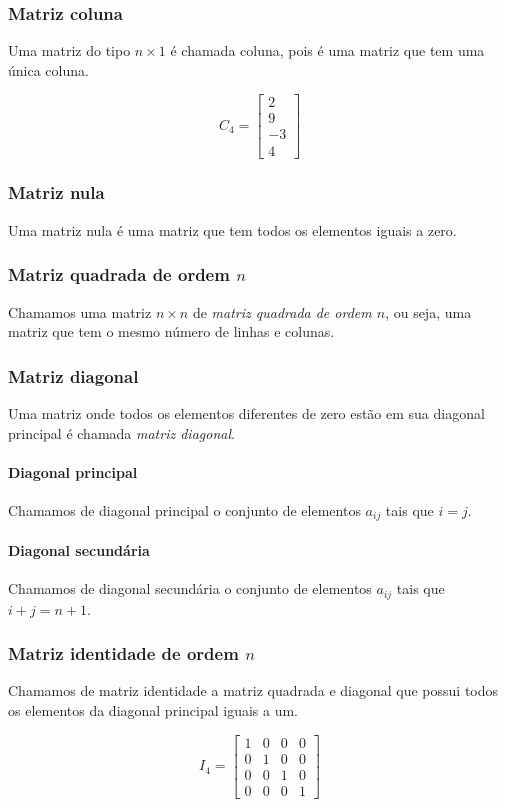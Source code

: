 \subsubsection*{Matriz coluna} Uma matriz do tipo $n \times 1$ é chamada coluna, pois é uma matriz que tem uma única coluna.
\begin{exemplo}
\[C_4=\begin{bmatrix} 
2 \\
9 \\
-3 \\
4 
\end{bmatrix}\]
\end{exemplo}

\subsubsection*{Matriz nula} Uma matriz nula é uma matriz que tem todos os elementos iguais a zero.
\subsubsection*{Matriz quadrada de ordem $n$} Chamamos uma matriz $n \times n$ de \emph{matriz quadrada de ordem $n$}, ou seja, uma matriz que tem o mesmo número de linhas e colunas.
\subsubsection*{Matriz diagonal}
Uma matriz onde todos os elementos diferentes de zero estão em sua diagonal principal é chamada \emph{matriz diagonal}.
\paragraph{Diagonal principal} Chamamos de diagonal principal o conjunto de elementos $a_{ij}$ tais que $i=j$.
\paragraph{Diagonal secundária} Chamamos de diagonal secundária o conjunto de elementos $a_{ij}$ tais que $i+j=n+1$.
\subsubsection*{Matriz identidade de ordem $n$} Chamamos de matriz identidade a matriz quadrada e diagonal que possui todos os elementos da diagonal principal iguais a um.
\begin{exemplo}
\[I_{4}=\begin{bmatrix} 
1 & 0 & 0 & 0 \\
0 & 1 & 0 & 0 \\
0 & 0 & 1 & 0 \\
0 & 0 & 0 & 1
\end{bmatrix}\]
\end{exemplo}

